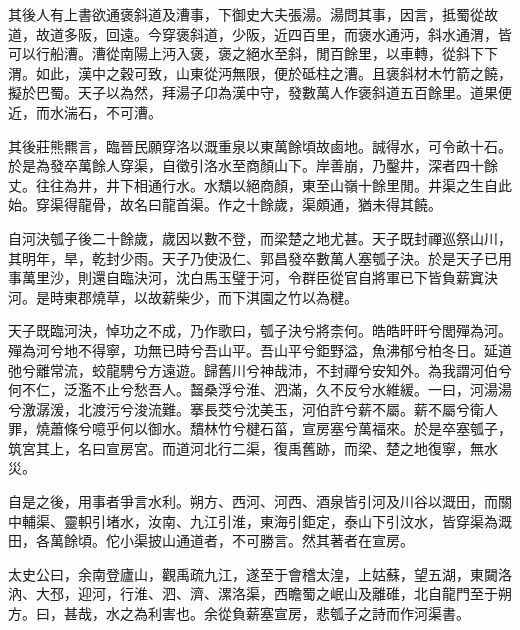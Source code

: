 其後人有上書欲通褒斜道及漕事，下御史大夫張湯。湯問其事，因言，抵蜀從故道，故道多阪，回遠。今穿褒斜道，少阪，近四百里，而褒水通沔，斜水通渭，皆可以行船漕。漕從南陽上沔入褒，褒之絕水至斜，閒百餘里，以車轉，從斜下下渭。如此，漢中之穀可致，山東從沔無限，便於砥柱之漕。且褒斜材木竹箭之饒，擬於巴蜀。天子以為然，拜湯子卬為漢中守，發數萬人作褒斜道五百餘里。道果便近，而水湍石，不可漕。

其後莊熊羆言，臨晉民願穿洛以溉重泉以東萬餘頃故鹵地。誠得水，可令畝十石。於是為發卒萬餘人穿渠，自徵引洛水至商顏山下。岸善崩，乃鑿井，深者四十餘丈。往往為井，井下相通行水。水穨以絕商顏，東至山嶺十餘里閒。井渠之生自此始。穿渠得龍骨，故名曰龍首渠。作之十餘歲，渠頗通，猶未得其饒。

自河決瓠子後二十餘歲，歲因以數不登，而梁楚之地尤甚。天子既封禪巡祭山川，其明年，旱，乾封少雨。天子乃使汲仁、郭昌發卒數萬人塞瓠子決。於是天子已用事萬里沙，則還自臨決河，沈白馬玉璧于河，令群臣從官自將軍已下皆負薪窴決河。是時東郡燒草，以故薪柴少，而下淇園之竹以為楗。

天子既臨河決，悼功之不成，乃作歌曰，瓠子決兮將柰何。皓皓旰旰兮閭殫為河。殫為河兮地不得寧，功無已時兮吾山平。吾山平兮鉅野溢，魚沸郁兮柏冬日。延道弛兮離常流，蛟龍騁兮方遠遊。歸舊川兮神哉沛，不封禪兮安知外。為我謂河伯兮何不仁，泛濫不止兮愁吾人。齧桑浮兮淮、泗滿，久不反兮水維緩。一曰，河湯湯兮激潺湲，北渡污兮浚流難。搴長茭兮沈美玉，河伯許兮薪不屬。薪不屬兮衛人罪，燒蕭條兮噫乎何以御水。穨林竹兮楗石菑，宣房塞兮萬福來。於是卒塞瓠子，筑宮其上，名曰宣房宮。而道河北行二渠，復禹舊跡，而梁、楚之地復寧，無水災。

自是之後，用事者爭言水利。朔方、西河、河西、酒泉皆引河及川谷以溉田，而關中輔渠、靈軹引堵水，汝南、九江引淮，東海引鉅定，泰山下引汶水，皆穿渠為溉田，各萬餘頃。佗小渠披山通道者，不可勝言。然其著者在宣房。

太史公曰，余南登廬山，觀禹疏九江，遂至于會稽太湟，上姑蘇，望五湖，東闚洛汭、大邳，迎河，行淮、泗、濟、漯洛渠，西瞻蜀之岷山及離碓，北自龍門至于朔方。曰，甚哉，水之為利害也。余從負薪塞宣房，悲瓠子之詩而作河渠書。